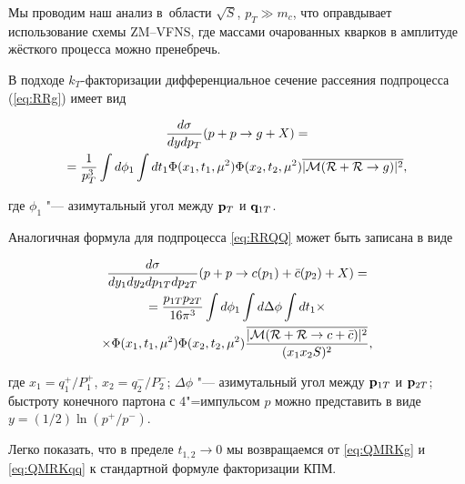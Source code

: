 Мы проводим наш анализ в~области $\sqrt S$, $p_T\gg m_c$, что оправдывает использование схемы ZM--VFNS, где массами очарованных кварков в амплитуде жёсткого процесса можно пренебречь.



В подходе $k_{T}$-факторизации дифференциальное сечение рассеяния подпроцесса (\ref{eq:RRg}) имеет вид

\begin{multline}

\frac{d \sigma}{dy dp_T}(p + p \to g + X)=\\

=\frac{1}{p_T^3} \int

d\phi_1 \int dt_1 \Phi(x_1,t_1,\mu^2) \Phi(x_2,t_2,\mu^2)

\overline{|{\cal M}(\mathcal{R} + \mathcal{R} \to g)|^2} ,

\label{eq:QMRKg}

\end{multline}

где $\phi_1$ "--- азимутальный угол между ${\bf p}_T$ и ${\bf q}_{1T}$.



Аналогичная формула для подпроцесса \eqref{eq:RRQQ} может быть записана в виде

\begin{multline}

\frac{d\sigma}{dy_1dy_2dp_{1T}dp_{2T}}(p + p \to c(p_1)+\bar 

c(p_2) + X)=

\\

=

 \frac{p_{1T}p_{2T}}{16 \pi^3} \int d\phi_1 \int

d\Delta\phi \int dt_1

\times \\

 \times \Phi(x_1,t_1,\mu^2) \Phi(x_2,t_2,\mu^2)

\frac{\overline{|{\cal M}(\mathcal{R} + \mathcal{R} \to c + \bar c)|^2}}{(x_1x_2 S)^2}, \label{eq:QMRKqq}

\end{multline}

где $x_1=q_1^+/P_1^+$, $x_2=q_2^-/P_2^-$; $\Delta\phi$ "--- азимутальный угол между ${\bf p}_{1T}$ и ${\bf p}_{2T}$; быстроту конечного партона с 4"=импульсом $p$ можно представить в виде \linebreak $y=({1/2})\ln ({p^+}/{p^-})$. 

Легко показать, что в пределе $t_{1,2}\to 0$ мы возвращаемся  от \eqref{eq:QMRKg} и \eqref{eq:QMRKqq} к стандартной формуле факторизации КПМ.



